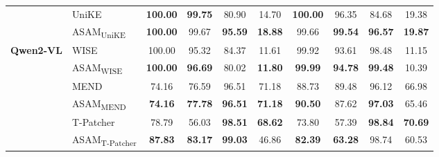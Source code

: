 \begin{table}[t]
\begin{tabular}{ll|cccc|cccc}
\cmidrule{2-10}
& UniKE & \textbf{100.00} & \textbf{99.75} & 80.90 & 14.70 & \textbf{100.00} & 96.35 & 84.68 & 19.38 \\
&\cellcolor[rgb]{0.949,0.949,0.949} ASAM\textsubscript{UniKE} &\cellcolor[rgb]{0.949,0.949,0.949} \textbf{100.00} &\cellcolor[rgb]{0.949,0.949,0.949} 99.67 &\cellcolor[rgb]{0.949,0.949,0.949} \textbf{95.59} &\cellcolor[rgb]{0.949,0.949,0.949} \textbf{18.88} &\cellcolor[rgb]{0.949,0.949,0.949} 99.66 &\cellcolor[rgb]{0.949,0.949,0.949} \textbf{99.54} &\cellcolor[rgb]{0.949,0.949,0.949} \textbf{96.57} &\cellcolor[rgb]{0.949,0.949,0.949} \textbf{19.87} \\
\midrule
\multirow{8}{1.7cm}{\centering\textbf{Qwen2-VL}} & WISE & 100.00 & 95.32 & 84.37 & 11.61 & 99.92 & 93.61 & 98.48 & 11.15 \\
&\cellcolor[rgb]{0.949,0.949,0.949} ASAM\textsubscript{WISE} &\cellcolor[rgb]{0.949,0.949,0.949} \textbf{100.00} &\cellcolor[rgb]{0.949,0.949,0.949} \textbf{96.69} &\cellcolor[rgb]{0.949,0.949,0.949} 80.02 &\cellcolor[rgb]{0.949,0.949,0.949} \textbf{11.80} &\cellcolor[rgb]{0.949,0.949,0.949} \textbf{99.99} &\cellcolor[rgb]{0.949,0.949,0.949} \textbf{94.78} &\cellcolor[rgb]{0.949,0.949,0.949} \textbf{99.48} &\cellcolor[rgb]{0.949,0.949,0.949} 10.39 \\
\cmidrule{2-10}
& MEND & 74.16 & 76.59 & 96.51 & 71.18 & 88.73 & 89.48 & 96.12 & 66.98 \\
&\cellcolor[rgb]{0.949,0.949,0.949} ASAM\textsubscript{MEND} &\cellcolor[rgb]{0.949,0.949,0.949} \textbf{74.16} &\cellcolor[rgb]{0.949,0.949,0.949} \textbf{77.78} &\cellcolor[rgb]{0.949,0.949,0.949} \textbf{96.51} &\cellcolor[rgb]{0.949,0.949,0.949} \textbf{71.18} &\cellcolor[rgb]{0.949,0.949,0.949} \textbf{90.50} &\cellcolor[rgb]{0.949,0.949,0.949} 87.62 &\cellcolor[rgb]{0.949,0.949,0.949} \textbf{97.03} &\cellcolor[rgb]{0.949,0.949,0.949} 65.46 \\
\cmidrule{2-10}
& T-Patcher & 78.79 & 56.03 & \textbf{98.51} & \textbf{68.62} & 73.80 & 57.39 & \textbf{98.84} & \textbf{70.69} \\
&\cellcolor[rgb]{0.949,0.949,0.949} ASAM\textsubscript{T-Patcher} &\cellcolor[rgb]{0.949,0.949,0.949} \textbf{87.83} &\cellcolor[rgb]{0.949,0.949,0.949} \textbf{83.17} &\cellcolor[rgb]{0.949,0.949,0.949} \textbf{99.03} &\cellcolor[rgb]{0.949,0.949,0.949} 46.86 &\cellcolor[rgb]{0.949,0.949,0.949} \textbf{82.39} &\cellcolor[rgb]{0.949,0.949,0.949} \textbf{63.28} &\cellcolor[rgb]{0.949,0.949,0.949} 98.74 &\cellcolor[rgb]{0.949,0.949,0.949} 60.53 \\

\end{tabular}
\end{table}
